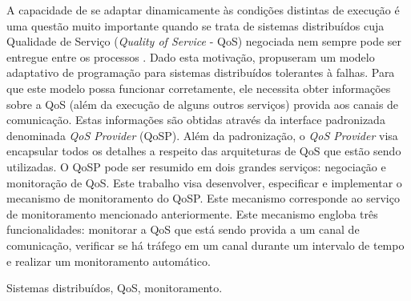 \resumo

	A capacidade de se adaptar dinamicamente às condições distintas de execução é uma questão muito importante quando se trata de sistemas distribuídos cuja Qualidade de Serviço (\textit{Quality of Service} - QoS) negociada nem sempre pode ser entregue entre os processos \cite{GMCR07}. Dado esta motivação, \cite{GMCR07} propuseram um modelo adaptativo de programação para sistemas distribuídos tolerantes à falhas. Para que este modelo possa funcionar corretamente, ele necessita obter informações sobre a QoS (além da execução de alguns outros serviços) provida aos canais de comunicação. Estas informações são obtidas através da interface padronizada denominada \textit{QoS Provider} (QoSP). Além da padronização, o \textit{QoS Provider} visa encapsular todos os detalhes a respeito das arquiteturas de QoS que estão sendo utilizadas. O QoSP pode ser resumido em dois grandes serviços: negociação e monitoração de QoS. Este trabalho visa desenvolver, especificar e implementar o mecanismo de monitoramento do QoSP. Este mecanismo corresponde ao serviço de monitoramento mencionado anteriormente. Este mecanismo engloba três funcionalidades: monitorar a QoS que está sendo provida a um canal de comunicação, verificar se há tráfego em um canal durante um intervalo de tempo e realizar um monitoramento automático.

\begin{keywords}
Sistemas distribuídos, QoS, monitoramento.
\end{keywords}


